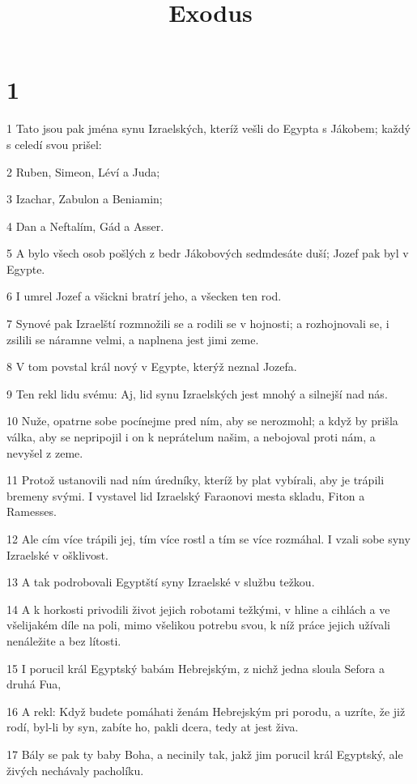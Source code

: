 

\title{Exodus}

\chapter{1}

\par 1 Tato jsou pak jména synu Izraelských, kteríž vešli do Egypta s Jákobem; každý s celedí svou prišel:
\par 2 Ruben, Simeon, Léví a Juda;
\par 3 Izachar, Zabulon a Beniamin;
\par 4 Dan a Neftalím, Gád a Asser.
\par 5 A bylo všech osob pošlých z bedr Jákobových sedmdesáte duší; Jozef pak byl v Egypte.
\par 6 I umrel Jozef a všickni bratrí jeho, a všecken ten rod.
\par 7 Synové pak Izraelští rozmnožili se a rodili se v hojnosti; a rozhojnovali se, i zsilili se náramne velmi, a naplnena jest jimi zeme.
\par 8 V tom povstal král nový v Egypte, kterýž neznal Jozefa.
\par 9 Ten rekl lidu svému: Aj, lid synu Izraelských jest mnohý a silnejší nad nás.
\par 10 Nuže, opatrne sobe pocínejme pred ním, aby se nerozmohl; a když by prišla válka, aby se nepripojil i on k neprátelum našim, a nebojoval proti nám, a nevyšel z zeme.
\par 11 Protož ustanovili nad ním úredníky, kteríž by plat vybírali, aby je trápili bremeny svými. I vystavel lid Izraelský Faraonovi mesta skladu, Fiton a Ramesses.
\par 12 Ale cím více trápili jej, tím více rostl a tím se více rozmáhal. I vzali sobe syny Izraelské v ošklivost.
\par 13 A tak podrobovali Egyptští syny Izraelské v službu težkou.
\par 14 A k horkosti privodili život jejich robotami težkými, v hline a cihlách a ve všelijakém díle na poli, mimo všelikou potrebu svou, k níž práce jejich užívali nenáležite a bez lítosti.
\par 15 I porucil král Egyptský babám Hebrejským, z nichž jedna sloula Sefora a druhá Fua,
\par 16 A rekl: Když budete pomáhati ženám Hebrejským pri porodu, a uzríte, že již rodí, byl-li by syn, zabíte ho, pakli dcera, tedy at jest živa.
\par 17 Bály se pak ty baby Boha, a necinily tak, jakž jim porucil král Egyptský, ale živých nechávaly pacholíku.
